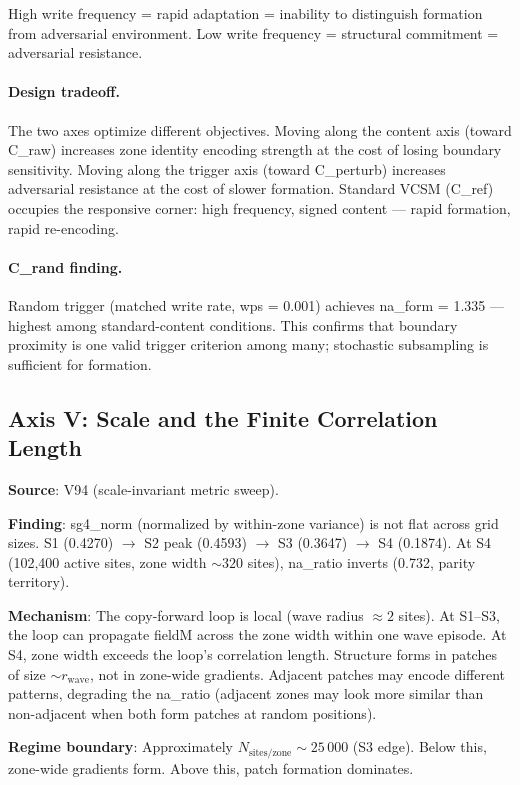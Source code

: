 \documentclass[11pt,a4paper]{article}
\begin{document}
High write frequency = rapid adaptation = inability to distinguish formation
from adversarial environment.
Low write frequency = structural commitment = adversarial resistance.

\paragraph{Design tradeoff.}
The two axes optimize different objectives.
Moving along the content axis (toward C\_raw) increases zone identity encoding
strength at the cost of losing boundary sensitivity.
Moving along the trigger axis (toward C\_perturb) increases adversarial
resistance at the cost of slower formation.
Standard VCSM (C\_ref) occupies the responsive corner: high frequency, signed
content --- rapid formation, rapid re-encoding.

\paragraph{C\_rand finding.}
Random trigger (matched write rate, wps = 0.001) achieves na\_form = 1.335 ---
highest among standard-content conditions.
This confirms that boundary proximity is one valid trigger criterion among many;
stochastic subsampling is sufficient for formation.

\subsection{Axis V: Scale and the Finite Correlation Length}

\textbf{Source}: V94 (scale-invariant metric sweep).

\textbf{Finding}: sg4\_norm (normalized by within-zone variance) is not flat
across grid sizes.
S1 (0.4270) $\to$ S2 peak (0.4593) $\to$ S3 (0.3647) $\to$ S4 (0.1874).
At S4 (102,400 active sites, zone width $\sim 320$ sites), na\_ratio inverts
(0.732, parity territory).

\textbf{Mechanism}: The copy-forward loop is local (wave radius $\approx 2$
sites).
At S1--S3, the loop can propagate fieldM across the zone width within one
wave episode.
At S4, zone width exceeds the loop's correlation length.
Structure forms in patches of size $\sim r_\text{wave}$, not in zone-wide
gradients.
Adjacent patches may encode different patterns, degrading the na\_ratio
(adjacent zones may look more similar than non-adjacent when both form patches
at random positions).

\textbf{Regime boundary}: Approximately $N_\text{sites/zone} \sim 25\,000$
(S3 edge).
Below this, zone-wide gradients form.
Above this, patch formation dominates.
\end{document}
